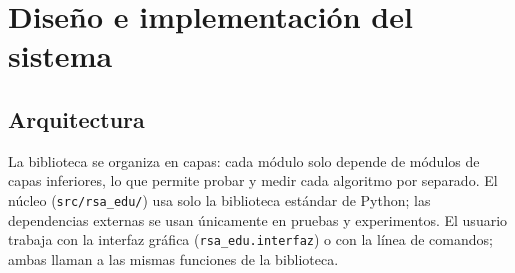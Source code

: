 \section{Diseño e implementación del sistema}
\label{sec:sistema}

\subsection{Arquitectura}

La biblioteca se organiza en capas: cada módulo solo depende de módulos de
capas inferiores, lo que permite probar y medir cada algoritmo por separado. El
núcleo (\texttt{src/rsa\_edu/}) usa solo la biblioteca estándar de Python; las
dependencias externas se usan únicamente en pruebas y experimentos. El usuario
trabaja con la interfaz gráfica (\texttt{rsa\_edu.interfaz}) o con la línea de
comandos; ambas llaman a las mismas funciones de la biblioteca.


